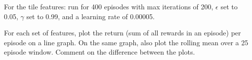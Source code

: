 \documentclass[11pt,addpoints,answers]{exam}
\begin{document}
\begin{questions}
\begin{parts}
    For the tile features: run for 400 episodes with max iterations of 200, $\epsilon$ set to 0.05, $\gamma$ set to 0.99, and a learning rate of 0.00005.
    
    For each set of features, plot the return (sum of all rewards in an episode) per episode on a line graph. On the same graph, also plot the rolling mean over a 25 episode window. Comment on the difference between the plots.
    
    \begin{your_solution}[title=Plot of Raw, height=10cm]
    \end{your_solution}
    
    \begin{your_solution}[title=Plot of Tile, height=10cm]
    \end{your_solution}
    

\end{parts}
\end{questions}
\end{document}
